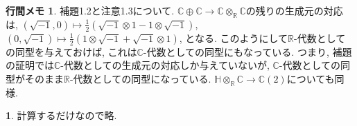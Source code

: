 \documentclass[dvipdfmx]{amsart}
\theoremstyle{definition}
\newtheorem{ans}{}
\numberwithin{ans}{section}
\newtheorem{mynote}{行間メモ}
\numberwithin{mynote}{section}
\newenvironment{note}
  {\begin{leftbar}\begin{mynote}}
  {\end{mynote}\end{leftbar}}
\begin{document}
\begin{note}
  補題1.2と注意1.3について.
  $\mathbb{C} \oplus \mathbb{C} \rightarrow \mathbb{C} \otimes_\mathbb{R} \mathbb{C}$の残りの生成元の対応は,
  $(\sqrt{-1}, 0) \mapsto \frac{1}{2}(\sqrt{-1} \otimes 1 - 1 \otimes \sqrt{-1})$,
  $(0, \sqrt{-1}) \mapsto \frac{1}{2}(1 \otimes \sqrt{-1} + \sqrt{-1} \otimes 1)$,
  となる. このようにして$\mathbb{R}$-代数としての同型を与えておけば, これは$\mathbb{C}$-代数としての同型にもなっている.
  つまり, 補題の証明では$\mathbb{C}$-代数としての生成元の対応しか与えていないが,
  $\mathbb{C}$-代数としての同型がそのまま$\mathbb{R}$-代数としての同型になっている.
  $\mathbb{H} \otimes_\mathbb{R} \mathbb{C} \rightarrow \mathbb{C}(2)$についても同様.
\end{note}

\begin{ans}
  計算するだけなので略.
\end{ans}
\end{document}
